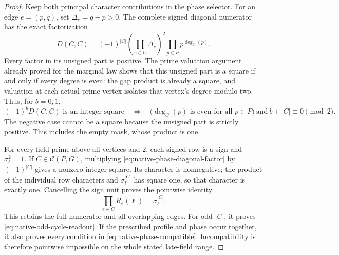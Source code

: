 \documentclass[11pt]{article}
\begin{document}
\begin{proof}
Keep both principal character contributions in the phase selector.
For an edge \(e=(p,q)\), set \(\Delta_e=q-p>0\).
The complete signed diagonal numerator has the exact factorization
\begin{equation}\label{eq:native-phase-diagonal-factor}
 D(C,C)=(-1)^{|C|}
   \left(\prod_{e\in C}\Delta_e\right)^2
   \prod_{p\in P}p^{\deg_C(p)}.
\end{equation}
Every factor in its unsigned part is positive. The prime valuation
argument already proved for the marginal law shows that this unsigned
part is a square if and only if every degree is even: the gap product
is already a square, and valuation at each actual prime vertex isolates
that vertex's degree modulo two. Thus, for \(b=0,1\),
\[
 (-1)^bD(C,C)\text{ is an integer square}
 \quad\Longleftrightarrow\quad
 \bigl(\deg_C(p)\text{ is even for all }p\in P\bigr)
       \ \text{and}\ b+|C|\equiv0\pmod2.
\]
The negative case cannot be a square because the unsigned part is
strictly positive. This includes the empty mask, whose product is one.

For every field prime above all vertices and \(2\), each signed row is
a sign and \(\sigma_\ell^2=1\).
If \(C\in\mathcal C(P,G)\), multiplying
\eqref{eq:native-phase-diagonal-factor} by \((-1)^{|C|}\)
gives a nonzero integer square. Its character is nonnegative; the
product of the individual row characters and
\(\sigma_\ell^{|C|}\) has square one, so that character is exactly one.
Cancelling the sign unit proves the pointwise identity
\[
 \prod_{e\in C}R_e(\ell)=\sigma_\ell^{|C|}.
\]
This retains the full numerator and all overlapping edges.
For odd \(|C|\), it proves \eqref{eq:native-odd-cycle-readout}.
If the prescribed profile and phase occur together, it also proves
every condition in \eqref{eq:native-phase-compatible}.
Incompatibility is therefore pointwise impossible on the whole stated
late-field range.


\end{proof}
\end{document}
